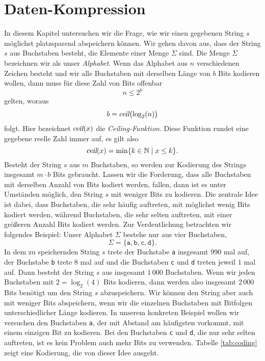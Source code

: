 \chapter{Daten-Kompression}
In diesem Kapitel untersuchen wir die Frage, wie wir einen gegebenen String $s$ m\"oglichst platzsparend
abspeichern k\"onnen.  Wir gehen davon aus, dass der String $s$ aus Buchstaben besteht, die 
Elemente einer Menge $\Sigma$ sind.  Die Menge $\Sigma$ bezeichnen wir als unser \emph{Alphabet}. 
Wenn das Alphabet aus $n$ verschiedenen Zeichen besteht und wir alle Buchstaben mit derselben L\"ange
von $b$ Bits kodieren wollen, dann muss f\"ur diese Zahl von Bits offenbar
\[ n \leq 2^b \] 
gelten, woraus
\[ b = \textsl{ceil}\bigl(\log_2(n)\bigr) \]
folgt.  Hier bezeichnet $\textsl{ceil}(x)$ die \emph{Ceiling-Funktion}.  Diese Funktion
rundet eine gegebene reelle Zahl immer auf, es gilt also
\[ \textsl{ceil}(x) = \min \{ k \in {\mathbb N} \mid x \leq k \}. \]
Besteht der String $s$ aus $m$ Buchstaben, so werden zur Kodierung des Strings insgesamt
$m \cdot b$ Bits gebraucht.  Lassen wir die Forderung, dass alle Buchstaben mit derselben
Anzahl von Bits kodiert werden, fallen, dann ist es unter Umst\"anden m\"oglich, den String
$s$ mit weniger Bits zu kodieren.  Die zentrale Idee ist dabei, dass Buchstaben, die sehr
h\"aufig auftreten, mit m\"oglichst wenig Bits kodiert werden, w\"ahrend Buchstaben, die sehr selten
auftreten, mit einer gr\"o{\ss}eren Anzahl Bits kodiert werden.  Zur Verdeutlichung betrachten
wir folgendes Beispiel:  Unser Alphabet  $\Sigma$ bestehe nur aus vier Buchstaben,
\[ \Sigma = \{ \mathtt{a}, \mathtt{b}, \mathtt{c}, \texttt{d} \}. \]
In dem zu speichernden String $s$ trete der Buchstabe \texttt{a} insgesamt $990$ mal auf, der
Buchstabe \texttt{b} trete $8$ mal auf und die Buchstaben \texttt{c} und \texttt{d} treten
jeweil $1$ mal auf.  Dann besteht der String $s$ aus insgesamt $1\,000$ 
Buchstaben.  Wenn wir jeden Buchstaben mit $2 = \log_2(4)$ Bits kodieren, dann werden also
insgesamt $2\,000$ Bits ben\"otigt um den String $s$ abzuspeichern.  Wir k\"onnen den String
aber auch mit weniger Bits abspeichern, wenn wir die einzelnen Buchstaben mit Bitfolgen
unterschiedlicher L\"ange kodieren.   In unserem konkreten
Beispiel wollen wir versuchen den Buchstaben \texttt{a}, der mit Abstand am h\"aufigsten
vorkommt, mit einem einzigen Bit zu kodieren.  Bei den  Buchstaben
\texttt{c} und \texttt{d}, die nur sehr selten auftreten, ist es kein Problem auch mehr
Bits zu verwenden.  Tabelle \ref{tab:coding} zeigt eine Kodierung, die von dieser Idee
ausgeht. 

